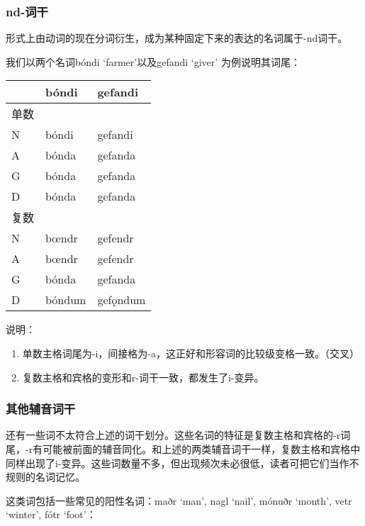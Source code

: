 \subsubsection{nd-词干}

形式上由动词的现在分词衍生，成为某种固定下来的表达的名词属于-nd词干。

我们以两个名词bóndi `farmer'以及gefandi `giver' 为例说明其词尾：

\begin{longtable}{lll}
  \toprule
       & \textbf{bóndi} & \textbf{gefandi} \\
  \midrule
  \endhead
  \bottomrule
  \endfoot
  单数 &                &                  \\
  N    & bóndi          & gefandi          \\
  A    & bónda          & gefanda          \\
  G    & bónda          & gefanda          \\
  D    & bónda          & gefanda          \\
  复数 &                &                  \\
  N    & bœndr          & gefendr          \\
  A    & bœndr          & gefendr          \\
  G    & bónda          & gefanda          \\
  D    & bóndum         & gefǫndum         \\
\end{longtable}

说明：

\begin{enumerate}
  \item
        单数主格词尾为-i，间接格为-a，这正好和形容词的比较级变格一致。（交叉）
  \item
        复数主格和宾格的变形和r-词干一致，都发生了i-变异。
\end{enumerate}

\subsubsection{其他辅音词干}

还有一些词不太符合上述的词干划分。这些名词的特征是复数主格和宾格的-r词尾，-r有可能被前面的辅音同化。和上述的两类辅音词干一样，复数主格和宾格中同样出现了i-变异。这些词数量不多，但出现频次未必很低，读者可把它们当作不规则的名词记忆。

这类词包括一些常见的阳性名词：maðr `man', nagl `nail', mónuðr `month',
vetr `winter', fótr `foot'：


